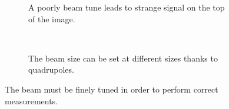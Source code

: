 \begin{figure}[!ht]
  \begin{subfigure}[t]{0.5\textwidth}
    
    \caption{A poorly beam tune leads to strange signal on the top of the image.}
    \label{chap4:beam_tuning_a}
  \end{subfigure}
  ~
  \begin{subfigure}[t]{0.5\textwidth}
    
    \caption{The beam size can be set at different sizes thanks to quadrupoles.}
    \label{chap4:beam_tuning_b}
  \end{subfigure}
  \caption[The beam must be finely tuned in order to perform correct measurements]{The beam must be finely tuned in order to perform correct measurements.}
  \label{chap4:beam_tuning}
\end{figure}
